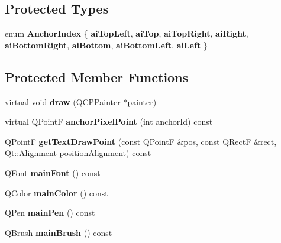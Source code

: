 \subsection*{Protected Types}
\begin{DoxyCompactItemize}
\item 
\hypertarget{class_q_c_p_item_text_a14a84e58f72519c8ae1d7a4a1dd23f21}{}\label{class_q_c_p_item_text_a14a84e58f72519c8ae1d7a4a1dd23f21} 
enum {\bfseries Anchor\+Index} \{ \newline
{\bfseries ai\+Top\+Left}, 
{\bfseries ai\+Top}, 
{\bfseries ai\+Top\+Right}, 
{\bfseries ai\+Right}, 
\newline
{\bfseries ai\+Bottom\+Right}, 
{\bfseries ai\+Bottom}, 
{\bfseries ai\+Bottom\+Left}, 
{\bfseries ai\+Left}
 \}
\end{DoxyCompactItemize}
\subsection*{Protected Member Functions}
\begin{DoxyCompactItemize}
\item 
\hypertarget{class_q_c_p_item_text_a8793adb271ab79b4cf391dc55e9987f1}{}\label{class_q_c_p_item_text_a8793adb271ab79b4cf391dc55e9987f1} 
virtual void {\bfseries draw} (\hyperlink{class_q_c_p_painter}{Q\+C\+P\+Painter} $\ast$painter)
\item 
\hypertarget{class_q_c_p_item_text_a3f999a0a7664421373601206bc35cc7c}{}\label{class_q_c_p_item_text_a3f999a0a7664421373601206bc35cc7c} 
virtual Q\+PointF {\bfseries anchor\+Pixel\+Point} (int anchor\+Id) const
\item 
\hypertarget{class_q_c_p_item_text_a4c76ad7e33c50aff0a60b8f38fe6060e}{}\label{class_q_c_p_item_text_a4c76ad7e33c50aff0a60b8f38fe6060e} 
Q\+PointF {\bfseries get\+Text\+Draw\+Point} (const Q\+PointF \&pos, const Q\+RectF \&rect, Qt\+::\+Alignment position\+Alignment) const
\item 
\hypertarget{class_q_c_p_item_text_af30ac2a0b84afa86a1dec22ab48dd07d}{}\label{class_q_c_p_item_text_af30ac2a0b84afa86a1dec22ab48dd07d} 
Q\+Font {\bfseries main\+Font} () const
\item 
\hypertarget{class_q_c_p_item_text_abe3f10805baf62797cb91fd4a4464fcc}{}\label{class_q_c_p_item_text_abe3f10805baf62797cb91fd4a4464fcc} 
Q\+Color {\bfseries main\+Color} () const
\item 
\hypertarget{class_q_c_p_item_text_a2f67fcbb7ac10ea9a94c4ecc3b0f4dfc}{}\label{class_q_c_p_item_text_a2f67fcbb7ac10ea9a94c4ecc3b0f4dfc} 
Q\+Pen {\bfseries main\+Pen} () const
\item 
\hypertarget{class_q_c_p_item_text_acddddd3ce88cfc87ab57b1ec4b25acb9}{}\label{class_q_c_p_item_text_acddddd3ce88cfc87ab57b1ec4b25acb9} 
Q\+Brush {\bfseries main\+Brush} () const
\end{DoxyCompactItemize}
